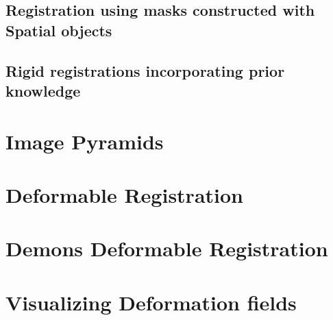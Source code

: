 \subsection{Registration using masks constructed with Spatial objects}
\label{sec:RegistrationSpatialObjects}
\ifitkFullVersion

\fi



\subsection{Rigid registrations incorporating prior knowledge}
\label{sec:RegistrationCentered2DTransform}
\ifitkFullVersion

\fi


\clearpage


\section{Image Pyramids}
\label{sec:ImagePyramids}
\ifitkFullVersion

\fi


\clearpage

\section{Deformable Registration}
\label{sec:DeformableRegistration}
\ifitkFullVersion

\fi

\clearpage

\section{Demons Deformable Registration}
\label{sec:DemonsDeformableRegistration}
\ifitkFullVersion

\fi

\section{Visualizing Deformation fields}
\label{sec:VisualizingDeformationFields}
\ifitkFullVersion

\fi

\ifitkFullVersion

\fi


